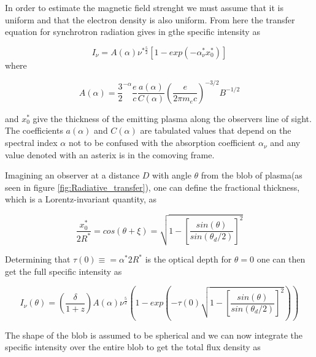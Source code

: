 In order to estimate the magnetic field strenght we must assume that it is uniform and that the electron density is also uniform. From here the transfer equation for synchrotron radiation gives in \cite{Hirotani_2005} gthe specific intensity as 

\begin{equation}
    I_\nu = A(\alpha) \nu^{*\frac{5}{2}}[1-exp(-\alpha_\nu^*x_0^* )] 
\end{equation}
where 

\begin{equation}
    A(\alpha) = \frac{3}{2}^{-\alpha}\frac{e}{c}\frac{a(\alpha)}{C(\alpha)}\left(\frac{e}{2\pi m_e c}\right)^{-3/2}B^{-1/2}
\end{equation}

and $x_0^*$ give the thickness of the emitting plasma along the observers line of sight. The coefficients $a(\alpha)$ and $C(\alpha)$ are tabulated values that depend on the spectral index $\alpha$ not to be confused with the absorption coefficient $\alpha_\nu$  and any value denoted with an asterix is in the comoving frame. 

Imagining an observer at a distance $D$ with angle $\theta$ from the blob of plasma(as seen in figure \ref{fig:Radiative_transfer}), one can define the fractional thickness, which is a Lorentz-invariant quantity, as

\begin{equation}
    \frac{x_0^*}{2R^*} = cos(\theta + \xi) = \sqrt{1-\left[\frac{sin(\theta)}{sin(\theta_d/2)}\right]^2}
\end{equation}

Determining that $\tau(0) \equiv = \alpha^*2R^*$ is the optical depth for $\theta = 0$ one can then get the full specific intensity as

\begin{equation}
    I_\nu(\theta) = \left( \frac{\delta}{1+z}\right)A(\alpha)\nu^{\frac{5}{2}}\left(1-exp \left(-\tau(0)\sqrt{1-\left[\frac{sin(\theta)}{sin(\theta_d/2)}\right]^2}\right)\right)
\end{equation}

The shape of the blob is assumed to be spherical and we can now integrate the specific intensity over the entire blob to get the total flux density as


